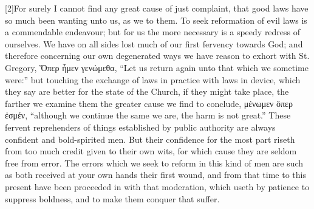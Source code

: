[2]For surely I cannot find any great cause of just complaint, that good laws have so much been wanting unto us, as we to them. To seek reformation of evil laws is a commendable endeavour; but for us the more necessary is a speedy redress of ourselves. We have on all sides lost much of our first fervency towards God; and therefore concerning our own degenerated ways we have reason to exhort with 
St. Gregory, Ὅπερ ἦμεν γενώμεθα, “Let us return again unto that which we sometime were:” but touching the exchange of laws in practice with laws in device, which they say are better for the state of the Church, if they might take place, the farther we examine them the greater cause we find to conclude, μένωμεν ὅπερ ἐσμέν, “although we continue the same we are, the harm is not great.” These fervent reprehenders of things established by public authority are always confident and bold-spirited men. But their confidence for the most part riseth from too much credit given to their own wits, for which cause they are seldom free from error. The errors which we seek to reform in this kind of men are such as both received at your own hands their first wound, and from that time to this present have been proceeded in with that moderation, which useth by patience to suppress boldness, and to make them conquer that suffer.

